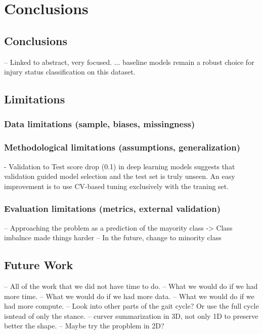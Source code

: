 \chapter{Conclusions}\label{chap:conclusions}

\section{Conclusions}\label{sec:conc-conclusions}
-- Linked to abstract, very focused.
... baseline models remain a robust choice for injury status classification on this dataset.

\section{Limitations}\label{sec:conc-limitations}

\subsection{Data limitations (sample, biases, missingness)}\label{sec:limitations-data}

\subsection{Methodological limitations (assumptions, generalization)}\label{sec:limitations-methods}
- Validation to Test score drop (0.1) in deep learning models suggests that validation guided model selection and the test set is truly unseen. An easy improvement is to use CV-based tuning exclusively with the traning set.

\subsection{Evaluation limitations (metrics, external validation)}\label{sec:limitations-evaluation}
-- Approaching the problem as a prediction of the mayority class -> Class imbalnce made things harder
    -- In the future, change to minority class

\section{Future Work}\label{sec:conc-future-work}
-- All of the work that we did not have time to do.
-- What we would do if we had more time.
-- What we would do if we had more data.
-- What we would do if we had more compute.
-- Look into other parts of the gait cycle? Or use the full cycle isntead of only the stance.
-- curver summarization in 3D, not only 1D to preserve better the shape.
-- Maybe try the propblem in 2D?